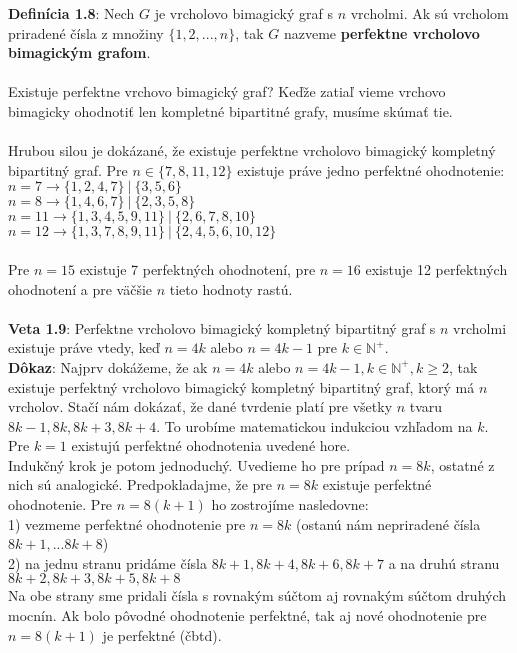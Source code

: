 \documentclass[12pt]{article}
\begin{document}
\textbf{Definícia 1.8}: Nech $G$ je vrcholovo bimagický graf s $n$ vrcholmi. Ak sú vrcholom priradené čísla z množiny $\{1, 2, ... , n\}$, tak $G$ nazveme \textbf{perfektne vrcholovo bimagickým grafom}. \\\\

Existuje perfektne vrchovo bimagický graf? Keďže zatiaľ vieme vrchovo bimagicky ohodnotiť len kompletné bipartitné grafy, musíme skúmať tie. \\\\

Hrubou silou je dokázané, že existuje perfektne vrcholovo bimagický kompletný bipartitný graf. Pre $n \in \{7, 8, 11, 12\}$ existuje práve jedno perfektné ohodnotenie: \\
$n = 7 \rightarrow \{1, 2, 4, 7\} ~|~ \{3, 5, 6\}$ \\
$n = 8 \rightarrow \{1, 4, 6, 7\} ~|~ \{2, 3, 5, 8\}$ \\
$n = 11 \rightarrow \{1, 3, 4, 5, 9, 11\} ~|~ \{2, 6, 7, 8, 10\}$ \\
$n = 12 \rightarrow \{1, 3, 7, 8, 9, 11\} ~|~ \{2, 4, 5, 6, 10, 12\}$ \\\\

Pre $n = 15$ existuje 7 perfektných ohodnotení, pre $n = 16$ existuje 12 perfektných ohodnotení a pre väčšie $n$ tieto hodnoty rastú. \\\\

\textbf{Veta 1.9}: Perfektne vrcholovo bimagický kompletný bipartitný graf s $n$ vrcholmi existuje práve vtedy, keď $n = 4k$ alebo $n = 4k-1$ pre $k \in \mathbb{N^+}$. \\

\textbf{Dôkaz}: Najprv dokážeme, že ak $n = 4k$ alebo $n = 4k-1, k \in \mathbb{N^+}, k \geq 2$, tak existuje perfektný vrcholovo bimagický kompletný bipartitný graf, ktorý má $n$ vrcholov. Stačí nám dokázať, že dané tvrdenie platí pre všetky $n$ tvaru $8k-1, 8k, 8k+3, 8k+4$. To urobíme matematickou indukciou vzhľadom na $k$. Pre $k = 1$ existujú perfektné ohodnotenia uvedené hore. \\

Indukčný krok je potom jednoduchý. Uvedieme ho pre prípad $n = 8k$, ostatné z nich sú analogické. Predpokladajme, že pre $n = 8k$ existuje perfektné ohodnotenie. Pre $n = 8(k+1)$ ho zostrojíme nasledovne: \\
1) vezmeme perfektné ohodnotenie pre $n = 8k$ (ostanú nám nepriradené čísla $8k+1, ... 8k+8$) \\
2) na jednu stranu pridáme čísla $8k+1, 8k+4, 8k+6, 8k+7$ a na druhú stranu $8k+2, 8k+3, 8k+5, 8k+8$ \\
Na obe strany sme pridali čísla s rovnakým súčtom aj rovnakým súčtom druhých mocnín. Ak bolo pôvodné ohodnotenie perfektné, tak aj nové ohodnotenie pre $n = 8(k+1)$ je perfektné (čbtd). \\
\end{document}
